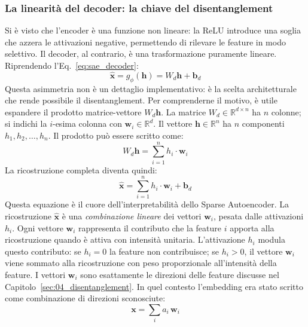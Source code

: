 \subsubsection{La linearità del decoder: la chiave del disentanglement}
\label{subsubsec:sae_decoder_linearity}
Si è visto che l'encoder è una funzione non lineare: la ReLU introduce una soglia che azzera le attivazioni negative, permettendo di rilevare le feature in modo selettivo. Il decoder, al contrario, è una trasformazione puramente lineare. Riprendendo l'Eq.~\ref{eq:sae_decoder}:
\begin{equation}
    \hat{\mathbf{x}} = g_\phi(\mathbf{h}) = W_d \mathbf{h} + \mathbf{b}_d
\end{equation}
Questa asimmetria non è un dettaglio implementativo: è la scelta architetturale che rende possibile il disentanglement. Per comprenderne il motivo, è utile espandere il prodotto matrice-vettore $W_d \mathbf{h}$. La matrice $W_d \in \mathbb{R}^{d \times n}$ ha $n$ colonne; si indichi la $i$-esima colonna con $\mathbf{w}_i \in \mathbb{R}^d$. Il vettore $\mathbf{h} \in \mathbb{R}^n$ ha $n$ componenti $h_1, h_2, \dots, h_n$. Il prodotto può essere scritto come:
\begin{equation}
    W_d \mathbf{h} = \sum_{i=1}^{n} h_i \cdot \mathbf{w}_i
    \label{eq:decoder_linear_combination}
\end{equation}
La ricostruzione completa diventa quindi:
\begin{equation}
    \hat{\mathbf{x}} = \sum_{i=1}^{n} h_i \cdot \mathbf{w}_i + \mathbf{b}_d
    \label{eq:reconstruction_explicit}
\end{equation}
Questa equazione è il cuore dell'interpretabilità dello Sparse Autoencoder. La ricostruzione $\hat{\mathbf{x}}$ è una \textit{combinazione lineare} dei vettori $\mathbf{w}_i$, pesata dalle attivazioni $h_i$. Ogni vettore $\mathbf{w}_i$ rappresenta il contributo che la feature $i$ apporta alla ricostruzione quando è attiva con intensità unitaria. L'attivazione $h_i$ modula questo contributo: se $h_i = 0$ la feature non contribuisce; se $h_i > 0$, il vettore $\mathbf{w}_i$ viene sommato alla ricostruzione con peso proporzionale all'intensità della feature.
I vettori $\mathbf{w}_i$ sono esattamente le direzioni delle feature discusse nel Capitolo~\ref{sec:04_disentanglement}. In quel contesto l'embedding era stato scritto come combinazione di direzioni sconosciute:
\begin{equation}
    \mathbf{x} = \sum_i a_i \, \mathbf{w}_i
\end{equation}

